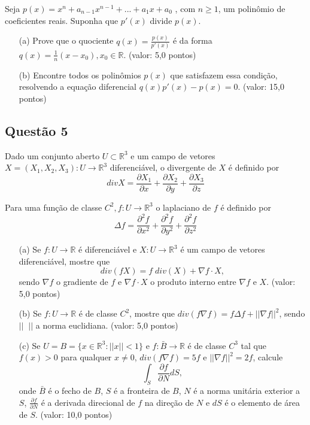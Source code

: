 \documentclass{report}
\begin{document}
Seja $p(x) = x^n + a_{n-1} x^{n-1} + ... + a_1 x + a_0$ , com $n \geq 1$, um polinômio de coeficientes reais. Suponha que $p'(x)$ divide $p(x)$.

\begin{enumerate}

\item[(a)] Prove que o quociente $q(x) = \displaystyle \frac{p(x)}{p'(x)}$ \'e da forma $q(x) = \frac1{n} (x-x_0), x_0 \in \mathbb R$. (valor: 5,0 pontos)

\item[(b)] Encontre todos os polinômios $p(x)$ que satisfazem essa condi\c c\~ao, resolvendo a equa\c c\~ao diferencial $q(x) p'(x)-p(x) = 0$. (valor: 15,0 pontos)

\end{enumerate}

\subsection{\color{blue} Quest\~ao 5}

Dado um conjunto aberto $U \subset \mathbb R^3$ e um campo de vetores $X = (X_1 , X_2 , X_3 ): U \to \mathbb R^3$ diferenci\'avel, o divergente de $X$ \'e definido por $$div X=\frac{\partial X_1}{\partial x}+\frac{\partial X_2}{\partial y}+\frac{\partial X_3}{\partial z}$$

Para uma fun\c c\~ao de classe $C^2, f: U \to \mathbb R^3$ o laplaciano de $f$ \'e definido por $$\Delta f = \frac{\partial^2 f}{\partial x^2}+\frac{\partial^2 f}{\partial y^2}+\frac{\partial^2 f}{\partial z^2}$$

\begin{enumerate}

\item[(a)] Se $f: U \to \mathbb R$ \'e diferenci\'avel e $X: U \to \mathbb R^3$ \'e um campo de vetores diferenci\'avel, mostre que $$div(f X)=f\; div(X) + \nabla f \cdot X ,$$ sendo $\nabla f$ o gradiente de $f$ e $\nabla f \cdot X$ o produto interno entre $\nabla f$ e $X$. (valor: 5,0 pontos)

\item[(b)] Se $f: U \to \mathbb R$ \'e de classe $C^2$, mostre que $div(f\nabla f) = f \Delta f + || \nabla f ||^2$, sendo $||\;\;||$ a norma euclidiana. (valor: 5,0 pontos)

\item[(c)] Se $U = B = \{x \in \mathbb R^3: || x || < 1\}$ e $f: \bar B \to \mathbb R$ \'e de classe $C^3$ tal que $f(x) > 0$ para qualquer $x \neq 0$, $div(f \nabla f) = 5f$ e $|| \nabla f ||^2= 2f$, calcule $$ \int_S \frac{\partial f}{\partial N} dS ,$$ onde $\bar B$ \'e o fecho de $B$, $S$ \'e a fronteira de $B$, $N$ \'e a norma unit\'aria exterior a $S$, $\displaystyle \frac{\partial f}{\partial N}$ \'e a derivada direcional de $f$ na dire\c c\~ao de $N$ e $dS$ \'e o elemento de \'area de $S$. (valor: 10,0 pontos)

\end{enumerate}
\end{document}
